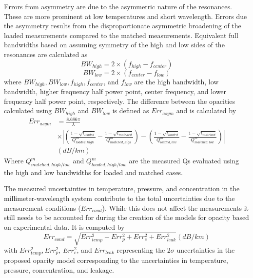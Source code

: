Errors from asymmetry are due to the asymmetric nature of the resonances. These are more prominent at low temperatures and short wavelength. Errors due the asymmetry results from the disproportionate asymmetric broadening of the loaded measurements compared to the matched measurements. Equivalent full bandwidths based on assuming symmetry of the high and low sides of the resonances are calculated as
\begin{equation}
BW_{high} = 2 \times (f_{high} - f_{center})
\end{equation}
\begin{equation}
BW_{low} = 2 \times (f_{center} - f_{low})
\end{equation}
where $BW_{high}, BW_{low}, f_{high}, f_{center}$, and $f_{low}$ are the high bandwidth, low bandwidth, higher frequency half power point, center frequency, and lower frequency half power point, respectively. The difference between the opacities calculated using $BW_{high}$ and $BW_{low}$ is defined as $Err_{asym}$ and is calculated by
\begin{equation}
\begin{split}
Err_{asym} &= \frac{8.686 \pi}{\lambda} 
\\ &\times \left| \left( \frac{1-\sqrt{t_{loaded}}}{Q^m_{loaded,high}} - \frac{1-\sqrt{t_{matched}}}{Q^m_{matched,high}} \right) - \left( \frac{1-\sqrt{t_{loaded}}}{Q^m_{loaded,low}} - \frac{1-\sqrt{t_{matched}}}{Q^m_{matched,low}} \right) \right|\\
 &(dB/km)
\end{split}
\end{equation}
Where $Q^m_{matched,high/low}$ and $Q^m_{loaded,high/low}$ are the measured Qs evaluated using the high and low bandwidths for loaded and matched cases. 

The measured uncertainties in temperature, pressure, and concentration in the millimeter-wavelength system contribute to the total uncertainties due to the measurement conditions ($Err_{cond}$). While this does not affect the measurements it still needs to be accounted for during the creation of the models for opacity based on experimental data. It is computed by
\begin{equation}
Err_{cond} = \sqrt{Err_{temp}^2 + Err_{p}^2 + Err_{c}^2 + Err_{leak}^2} (dB/km)
\end{equation}
with $Err_{temp}^2, Err_{p}^2 $, $ Err_{c}^2$, and $Err_{leak}$ representing the 2$\sigma$ uncertainties in the proposed opacity model corresponding to the uncertainties in temperature, pressure, concentration, and leakage. 

